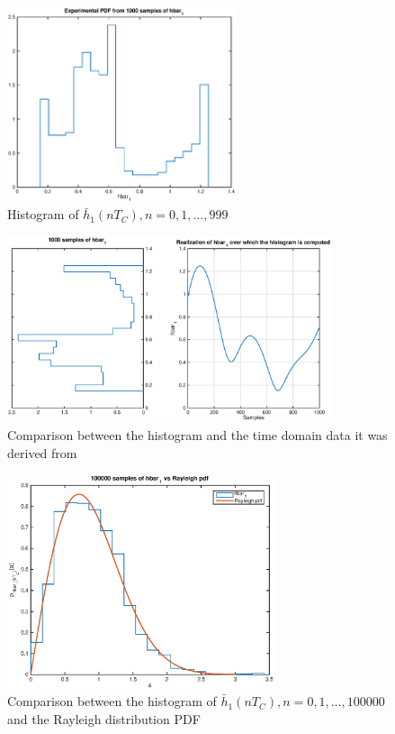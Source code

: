\documentclass[10pt]{article}
\begin{document}
\begin{figure}[h!]
  \centering
  \includegraphics[width = 0.6\textwidth]{p01_h1hist}
  \caption{Histogram of $\bar{h}_1(nT_C), n = 0, 1, \dots, 999$}
  \label{fig:h1hist}
\end{figure}

\begin{figure}[h!]
  \centering
  \includegraphics[width = 0.85\textwidth]{p02_h1hist}
  \caption{Comparison between the histogram and the time domain data it was derived from}
  \label{fig:h1histvstime}
\end{figure}

\begin{figure}[h!]
  \centering
  \includegraphics[width = 0.7\textwidth]{p04_h1hist}
  \caption{Comparison between the histogram of $\bar{h}_1(nT_C), n = 0, 1, \dots, 100000$ and the Rayleigh distribution PDF}
  \label{fig:h1hist100000}
\end{figure}
\end{document}
